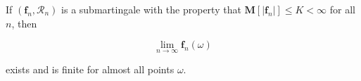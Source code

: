 If $(\mathbf{f}_n, \mathcal{R}_n)$ is a submartingale with the property that $\mathbf{M}[|\mathbf{f}_n|] \leq K < \infty$ for all $n$, then

$$\lim_{n \to \infty} \mathbf{f}_n(\omega)$$

exists and is finite for almost all points $\omega$.
